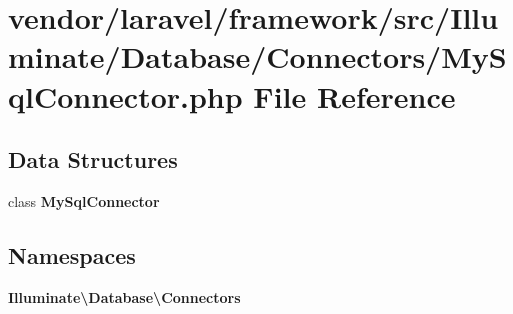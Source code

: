 \section{vendor/laravel/framework/src/\+Illuminate/\+Database/\+Connectors/\+My\+Sql\+Connector.php File Reference}
\label{_my_sql_connector_8php}
\subsection*{Data Structures}
\begin{DoxyCompactItemize}
\item 
class {\bf My\+Sql\+Connector}
\end{DoxyCompactItemize}
\subsection*{Namespaces}
\begin{DoxyCompactItemize}
\item 
 {\bf Illuminate\textbackslash{}\+Database\textbackslash{}\+Connectors}
\end{DoxyCompactItemize}
